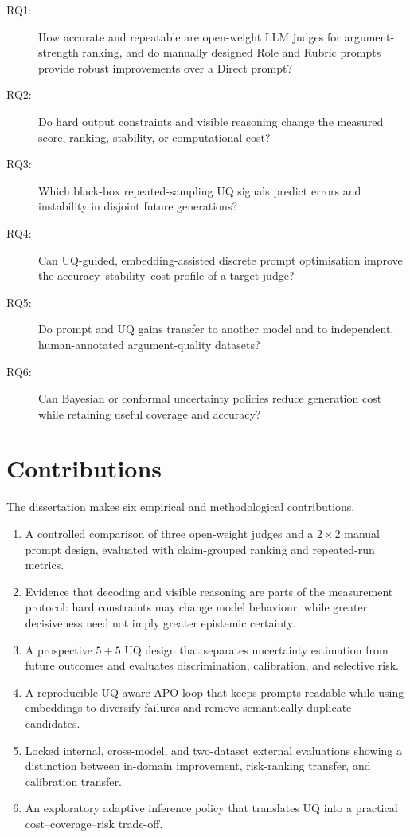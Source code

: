 \documentclass[11pt,twoside,a4paper]{report}
\begin{document}
\begin{description}
  \item[RQ1:] How accurate and repeatable are open-weight LLM judges for
  argument-strength ranking, and do manually designed Role and Rubric prompts provide
  robust improvements over a Direct prompt?
  \item[RQ2:] Do hard output constraints and visible reasoning change the measured
  score, ranking, stability, or computational cost?
  \item[RQ3:] Which black-box repeated-sampling UQ signals predict errors and
  instability in disjoint future generations?
  \item[RQ4:] Can UQ-guided, embedding-assisted discrete prompt optimisation improve
  the accuracy--stability--cost profile of a target judge?
  \item[RQ5:] Do prompt and UQ gains transfer to another model and to independent,
  human-annotated argument-quality datasets?
  \item[RQ6:] Can Bayesian or conformal uncertainty policies reduce generation cost
  while retaining useful coverage and accuracy?
\end{description}

\section{Contributions}

The dissertation makes six empirical and methodological contributions.

\begin{enumerate}
  \item A controlled comparison of three open-weight judges and a $2\times2$ manual
  prompt design, evaluated with claim-grouped ranking and repeated-run metrics.
  \item Evidence that decoding and visible reasoning are parts of the measurement
  protocol: hard constraints may change model behaviour, while greater decisiveness
  need not imply greater epistemic certainty.
  \item A prospective $5+5$ UQ design that separates uncertainty estimation from
  future outcomes and evaluates discrimination, calibration, and selective risk.
  \item A reproducible UQ-aware APO loop that keeps prompts readable while using
  embeddings to diversify failures and remove semantically duplicate candidates.
  \item Locked internal, cross-model, and two-dataset external evaluations showing a
  distinction between in-domain improvement, risk-ranking transfer, and calibration
  transfer.
  \item An exploratory adaptive inference policy that translates UQ into a practical
  cost--coverage--risk trade-off.
\end{enumerate}
\end{document}
